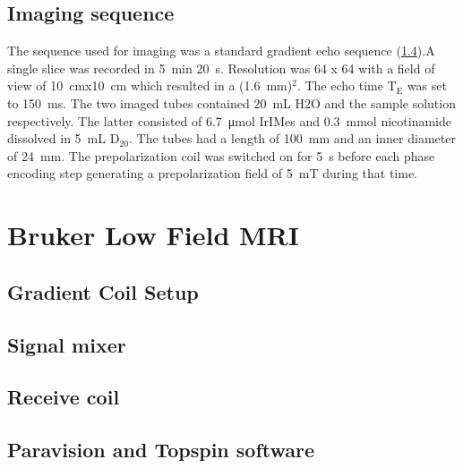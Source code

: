         \subsection{Imaging sequence}
        The sequence used for imaging was a standard gradient echo sequence (\ref{}).A single slice was recorded in \SI{5}{\minute} \SI{20}{\second}. Resolution was 64 x 64 with a field of view of \SI{10}{\cm}x\SI{10}{\cm} which resulted in a (\SI{1.6}{\mm})$^2$. The echo time $\mathrm{T_E}$ was set to \SI{150}{\milli\second}. The two imaged tubes contained \SI{20}{\milli\liter} H2O and the sample solution respectively. The latter consisted of \SI{6.7}{\micro\mole} IrIMes and \SI{0.3}{\milli\mole} nicotinamide dissolved in \SI{5}{\milli\liter} $\mathrm{D_20}$. The tubes had a length of \SI{100}{\milli\meter} and an inner diameter of \SI{24}{\milli\meter}. The prepolarization coil was switched on for \SI{5}{\second} before each phase encoding step generating a prepolarization field of \SI{5}{\milli\tesla} during that time. 
    \section{Bruker Low Field MRI}
        \subsection{Gradient Coil Setup}
        \subsection{Signal mixer}
        \subsection{Receive coil}
        \subsection{Paravision and Topspin software}
